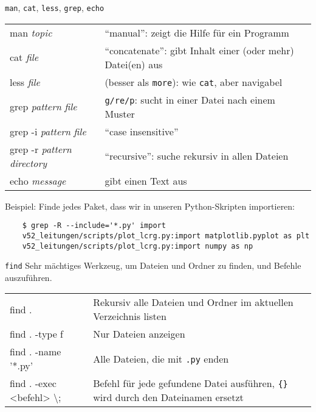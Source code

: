 \begin{frame}[fragile]{\texttt{man}, \texttt{cat}, \texttt{less}, \texttt{grep}, \texttt{echo}}
  \begin{tabu}{>{\ttfamily}l X[,L]}
    man \textit{topic}    & \enquote{manual}: zeigt die Hilfe für ein Programm \\
    cat \textit{file}                           & \enquote{concatenate}: gibt Inhalt einer (oder mehr) Datei(en) aus \\
    less \textit{file}                          & (besser als \texttt{more}): wie \texttt{cat}, aber navigabel \\
    grep \textit{pattern} \textit{file}         & \texttt{g/re/p}: sucht in einer Datei nach einem Muster \\
    grep -i \textit{pattern} \textit{file}      & \enquote{case insensitive} \\
    grep -r \textit{pattern} \textit{directory} & \enquote{recursive}: suche rekursiv in allen Dateien \\
    echo \textit{message}                       & gibt einen Text aus
  \end{tabu}

  Beispiel: Finde jedes Paket, dass wir in unseren Python-Skripten importieren:

  \begin{verbatim}
    $ grep -R --include='*.py' import
    v52_leitungen/scripts/plot_lcrg.py:import matplotlib.pyplot as plt
    v52_leitungen/scripts/plot_lcrg.py:import numpy as np
  \end{verbatim}

\end{frame}

\begin{frame}[fragile]{\texttt{find}}
  Sehr mächtiges Werkzeug, um Dateien und Ordner zu finden, und Befehle auszuführen.

  \begin{tabu}{>{\ttfamily}l X[,L]}
    find . & Rekursiv alle Dateien und Ordner im aktuellen Verzeichnis listen \\
    find . -type f & Nur Dateien anzeigen \\
    find . -name '*.py' & Alle Dateien, die mit \texttt{.py} enden \\
    find . -exec <befehl> \textbackslash{}; & Befehl für jede gefundene Datei ausführen, \texttt{\{\}} wird durch den Dateinamen ersetzt \\
  \end{tabu}
\end{frame}


